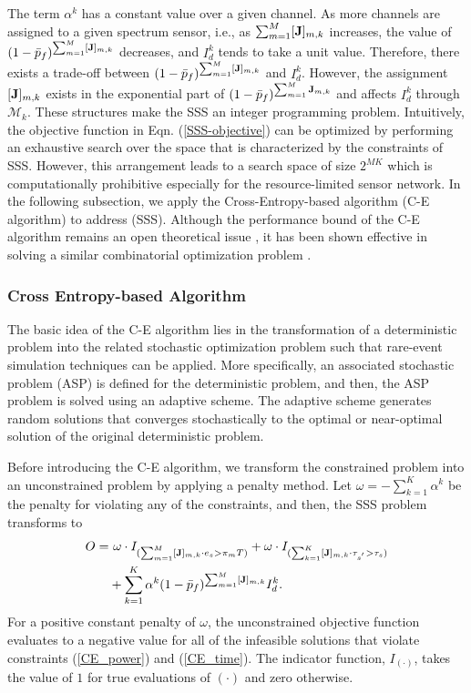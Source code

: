 \documentclass[journal]{IEEEtran} \ifCLASSINFOpdf
\begin{document}
The term $\alpha^k$ has a constant value over a given channel. As more channels are assigned to a given spectrum sensor, i.e., as ${\sum_{m=1}^M [{\bf J}]_{m,k}}$ increases, the value of $(1-\bar{p}_f)^{\sum_{m=1}^M [{\bf J}]_{m,k}}$ decreases, and $I_d^k$ tends to take a unit value. Therefore, there exists a trade-off between $(1-\bar{p}_f)^{\sum_{m=1}^M [{\bf J}]_{m,k}}$ and $I_d^k$. However, the assignment $[{\bf J}]_{m,k}$ exists in the exponential part of $(1-\bar{p}_f)^{\sum_{m=1}^M {\bf J}_{m,k}}$ and affects $I_d^k$ through $\mathcal{M}_k$. These structures make the SSS an integer programming problem. Intuitively, the objective function in Eqn. (\ref{SSS-objective}) can be optimized by performing an exhaustive search over the space that is characterized by the constraints of SSS. However, this arrangement leads to a search space of size $2^{MK}$ which is computationally prohibitive especially for the resource-limited sensor network. In the following subsection, we apply the Cross-Entropy-based algorithm (C-E algorithm) \cite{Rubinstein1999} to address (SSS). Although the performance bound of the C-E algorithm remains an open theoretical issue \cite{DeBoer2005}, it has been shown effective in solving a similar combinatorial optimization problem \cite{Zhang2014}.

\subsubsection{Cross Entropy-based Algorithm}
The basic idea of the C-E algorithm lies in the transformation of a deterministic problem into the related stochastic optimization problem such that rare-event simulation techniques can be applied. More specifically, an associated stochastic problem (ASP) is defined for the deterministic problem, and then, the ASP problem is solved using an adaptive scheme. The adaptive scheme generates random solutions that converges stochastically to the optimal or near-optimal solution of the original deterministic problem.


Before introducing the C-E algorithm, we transform the constrained problem into an unconstrained problem by applying a penalty method. Let $\omega = -\sum_{k=1}^K \alpha^k$ be the penalty for violating any of the constraints, and then, the SSS problem transforms to
\begin{equation}
\label{eqn_objce}
\begin{aligned}
O = & ~\omega \cdot  I_{(\sum_{m=1}^M [{\bf J}]_{m, k} \cdot e_s> \pi_m T)} + \omega \cdot I_{(\sum_{k=1}^K [{\bf J}]_{m, k} \cdot \tau_{s^{'}} > \tau_s)}  \\
& +\sum_{k=1}^K \alpha^k (1-\bar{p}_f)^{\sum_{m=1}^M [{\bf J}]_{m,k}} I^k_d.
\end{aligned}
\end{equation}
For a positive constant penalty of $\omega$, the unconstrained objective function evaluates to a negative value for all of the infeasible solutions that violate constraints (\ref{CE_power}) and (\ref{CE_time}). The indicator function, $I_{(\cdot)}$, takes the value of $1$ for true evaluations of $(\cdot)$ and zero otherwise.
\end{document}
